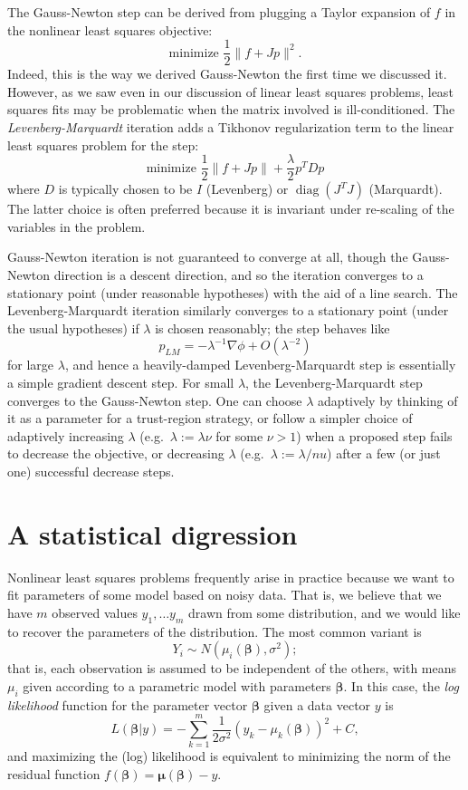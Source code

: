 \documentclass[12pt, leqno]{article} %
\newcommand{\bfmu}{\boldsymbol{\mu}}
\newcommand{\bfbeta}{\boldsymbol{\beta}}
\begin{document}
The Gauss-Newton step can be derived from plugging a Taylor expansion
of $f$ in the nonlinear least squares objective:
\[
  \mbox{minimize } \frac{1}{2} \|f + Jp\|^2.
\]
Indeed, this is the way we derived Gauss-Newton the first time we
discussed it.  However, as we saw even in our discussion of linear
least squares problems, least squares fits may be problematic when
the matrix involved is ill-conditioned.  The {\em Levenberg-Marquardt}
iteration adds a Tikhonov regularization term to the linear least
squares problem for the step:
\[
  \mbox{minimize } \frac{1}{2} \|f+Jp\| + \frac{\lambda}{2} p^T D p
\]
where $D$ is typically chosen to be $I$ (Levenberg) or
$\operatorname{diag}(J^T J)$ (Marquardt).  The latter choice is often
preferred because it is invariant under re-scaling of the variables in
the problem.

Gauss-Newton iteration is not guaranteed to converge at all, though
the Gauss-Newton direction is a descent direction, and so the
iteration converges to a stationary point (under reasonable
hypotheses) with the aid of a line search.
The Levenberg-Marquardt iteration similarly converges to a stationary
point (under the usual hypotheses) if $\lambda$ is chosen reasonably;
the step behaves like
\[
  p_{LM} = -\lambda^{-1} \nabla \phi + O(\lambda^{-2})
\]
for large $\lambda$, and hence a heavily-damped Levenberg-Marquardt
step is essentially a simple gradient descent step.  For small
$\lambda$, the Levenberg-Marquardt step converges to the
Gauss-Newton step.  One can choose $\lambda$ adaptively by thinking
of it as a parameter for a trust-region strategy, or follow a simpler
choice of adaptively increasing $\lambda$
(e.g.~$\lambda :=  \lambda \nu$ for some $\nu > 1$)
when a proposed step fails to decrease
the objective, or decreasing $\lambda$
(e.g.~$\lambda := \lambda/nu$) after a few (or just one) successful
decrease steps.

\section{A statistical digression}

Nonlinear least squares problems frequently arise in practice because
we want to fit parameters of some model based on noisy data.  That is,
we believe that we have $m$ observed values $y_1, \ldots y_m$ drawn
from some distribution, and we would like to recover the parameters of
the distribution.  The most common variant is
\[
  Y_i \sim N(\mu_i(\bfbeta), \sigma^2);
\]
that is, each observation is assumed to be independent of the others,
with means $\mu_i$ given according to a parametric model with
parameters $\bfbeta$.  In this case, the {\em log likelihood} function
for the parameter vector $\bfbeta$ given a data vector $y$ is
\[
  L(\bfbeta | y)
  = -\sum_{k=1}^m \frac{1}{2\sigma^2}
    (y_k-\mu_k(\bfbeta))^2 + C,
\]
and maximizing the (log) likelihood is equivalent to minimizing the norm of
the residual function $f(\bfbeta) = \bfmu(\bfbeta)-y$.
\end{document}
